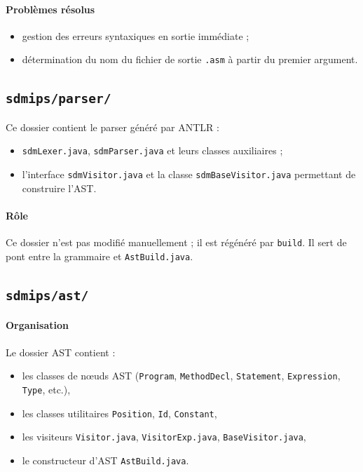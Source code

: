 \documentclass[a4paper,11pt]{article}
\begin{document}
\paragraph{Problèmes résolus}
\begin{itemize}
  \item gestion des erreurs syntaxiques en sortie immédiate ;
  \item détermination du nom du fichier de sortie \texttt{.asm} à partir du premier argument.
\end{itemize}

\subsection{\texttt{sdmips/parser/}}
Ce dossier contient le parser généré par ANTLR :
\begin{itemize}
  \item \texttt{sdmLexer.java}, \texttt{sdmParser.java} et leurs classes auxiliaires ;
  \item l'interface \texttt{sdmVisitor.java} et la classe \texttt{sdmBaseVisitor.java} permettant de construire l'AST.
\end{itemize}

\paragraph{Rôle}
Ce dossier n'est pas modifié manuellement ; il est régénéré par \texttt{build}. Il sert de pont entre la grammaire et \texttt{AstBuild.java}.

\subsection{\texttt{sdmips/ast/}}
\paragraph{Organisation}
Le dossier AST contient :
\begin{itemize}
  \item les classes de nœuds AST (\texttt{Program}, \texttt{MethodDecl}, \texttt{Statement}, \texttt{Expression}, \texttt{Type}, etc.),
  \item les classes utilitaires \texttt{Position}, \texttt{Id}, \texttt{Constant},
  \item les visiteurs \texttt{Visitor.java}, \texttt{VisitorExp.java}, \texttt{BaseVisitor.java},
  \item le constructeur d'AST \texttt{AstBuild.java}.
\end{itemize}
\end{document}
